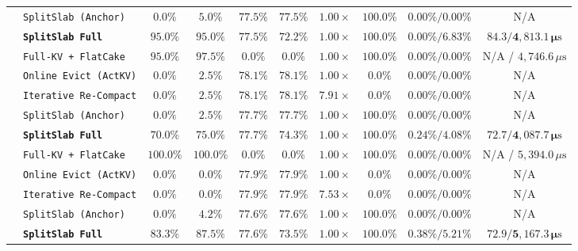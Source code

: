 \documentclass[final,5p,times,twocolumn]{elsarticle}
\theoremstyle{definition}
\theoremstyle{remark}
\begin{document}
\begin{table}[!t]
\begin{tabular}{@{}llcccccccc@{}}
 & \texttt{SplitSlab (Anchor)} & $0.0\%$ & $5.0\%$ & $77.5\%$ & $77.5\%$ & $1.00\times$ & $100.0\%$ & $0.00\% / 0.00\%$ & N/A \\
 & \textbf{\texttt{SplitSlab Full}} & $\mathbf{95.0\%}$ & $\mathbf{95.0\%}$ & $\mathbf{77.5\%}$ & $\mathbf{72.2\%}$ & $\mathbf{1.00\times}$ & $\mathbf{100.0\%}$ & $\mathbf{0.00\% / 6.83\%}$ & $\mathbf{84.3 / 4{,}813.1\,\mu\mathrm{s}}$ \\
\midrule
{}
 & \texttt{Full-KV + FlatCake} & $95.0\%$ & $97.5\%$ & $0.0\%$ & $0.0\%$ & $1.00\times$ & $100.0\%$ & $0.00\% / 0.00\%$ & N/A / $4{,}746.6\,\mu\mathrm{s}$ \\
 & \texttt{Online Evict (ActKV)} & $0.0\%$ & $2.5\%$ & $78.1\%$ & $78.1\%$ & $1.00\times$ & $0.0\%$ & $0.00\% / 0.00\%$ & N/A \\
 & \texttt{Iterative Re-Compact} & $0.0\%$ & $2.5\%$ & $78.1\%$ & $78.1\%$ & $7.91\times$ & $0.0\%$ & $0.00\% / 0.00\%$ & N/A \\
 & \texttt{SplitSlab (Anchor)} & $0.0\%$ & $2.5\%$ & $77.7\%$ & $77.7\%$ & $1.00\times$ & $100.0\%$ & $0.00\% / 0.00\%$ & N/A \\
 & \textbf{\texttt{SplitSlab Full}} & $\mathbf{70.0\%}$ & $\mathbf{75.0\%}$ & $\mathbf{77.7\%}$ & $\mathbf{74.3\%}$ & $\mathbf{1.00\times}$ & $\mathbf{100.0\%}$ & $\mathbf{0.24\% / 4.08\%}$ & $\mathbf{72.7 / 4{,}087.7\,\mu\mathrm{s}}$ \\
\midrule
{}
 & \texttt{Full-KV + FlatCake} & $100.0\%$ & $100.0\%$ & $0.0\%$ & $0.0\%$ & $1.00\times$ & $100.0\%$ & $0.00\% / 0.00\%$ & N/A / $5{,}394.0\,\mu\mathrm{s}$ \\
 & \texttt{Online Evict (ActKV)} & $0.0\%$ & $0.0\%$ & $77.9\%$ & $77.9\%$ & $1.00\times$ & $0.0\%$ & $0.00\% / 0.00\%$ & N/A \\
 & \texttt{Iterative Re-Compact} & $0.0\%$ & $0.0\%$ & $77.9\%$ & $77.9\%$ & $7.53\times$ & $0.0\%$ & $0.00\% / 0.00\%$ & N/A \\
 & \texttt{SplitSlab (Anchor)} & $0.0\%$ & $4.2\%$ & $77.6\%$ & $77.6\%$ & $1.00\times$ & $100.0\%$ & $0.00\% / 0.00\%$ & N/A \\
 & \textbf{\texttt{SplitSlab Full}} & $\mathbf{83.3\%}$ & $\mathbf{87.5\%}$ & $\mathbf{77.6\%}$ & $\mathbf{73.5\%}$ & $\mathbf{1.00\times}$ & $\mathbf{100.0\%}$ & $\mathbf{0.38\% / 5.21\%}$ & $\mathbf{72.9 / 5{,}167.3\,\mu\mathrm{s}}$ \\
\bottomrule
\end{tabular}
\end{table}
\end{document}
